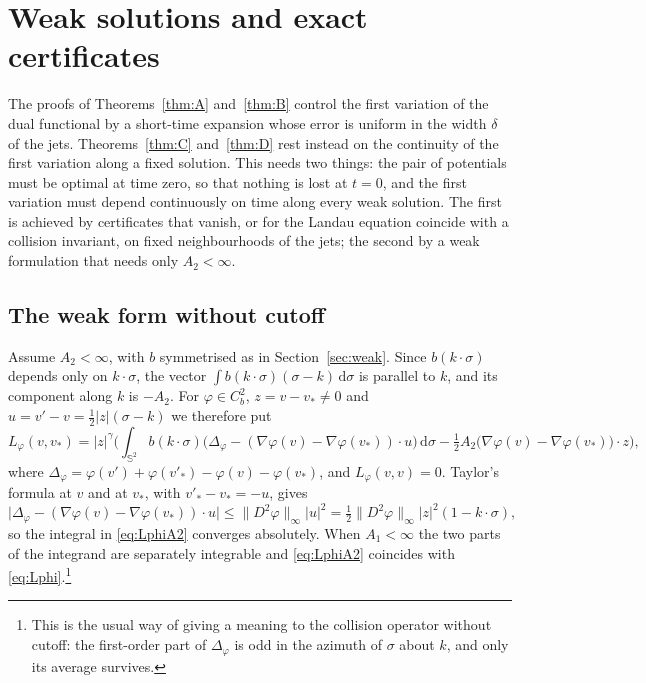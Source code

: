 \documentclass[11pt]{amsart}
\theoremstyle{definition}
\newcommand{\Sph}{\mathbb{S}}
\newcommand{\dd}{\,\mathrm{d}}
\begin{document}
\section{Weak solutions and exact certificates}\label{sec:exact}

The proofs of Theorems~\ref{thm:A} and~\ref{thm:B} control the first variation of the dual functional by a short-time expansion whose error is uniform in the width $\delta$ of the jets. Theorems~\ref{thm:C} and~\ref{thm:D} rest instead on the continuity of the first variation along a fixed solution. This needs two things: the pair of potentials must be optimal at time zero, so that nothing is lost at $t=0$, and the first variation must depend continuously on time along every weak solution. The first is achieved by certificates that vanish, or for the Landau equation coincide with a collision invariant, on fixed neighbourhoods of the jets; the second by a weak formulation that needs only $A_2<\infty$.

\subsection{The weak form without cutoff}
Assume $A_2<\infty$, with $b$ symmetrised as in Section~\ref{sec:weak}. Since $b(k\cdot\sigma)$ depends only on $k\cdot\sigma$, the vector $\int b(k\cdot\sigma)(\sigma-k)\dd\sigma$ is parallel to $k$, and its component along $k$ is $-A_2$. For $\varphi\in C^2_b$, $z=v-v_*\ne0$ and $u=v'-v=\frac12|z|(\sigma-k)$ we therefore put
\begin{equation}\label{eq:LphiA2}
L_\varphi(v,v_*)=|z|^\gamma\Big(\int_{\Sph^2}b(k\cdot\sigma)\big(\Delta_\varphi-(\nabla\varphi(v)-\nabla\varphi(v_*))\cdot u\big)\dd\sigma-\tfrac12A_2\big(\nabla\varphi(v)-\nabla\varphi(v_*)\big)\cdot z\Big),
\end{equation}
where $\Delta_\varphi=\varphi(v')+\varphi(v'_*)-\varphi(v)-\varphi(v_*)$, and $L_\varphi(v,v)=0$. Taylor's formula at $v$ and at $v_*$, with $v'_*-v_*=-u$, gives
\begin{equation}\label{eq:taylor2}
\big|\Delta_\varphi-(\nabla\varphi(v)-\nabla\varphi(v_*))\cdot u\big|\le\|D^2\varphi\|_\infty|u|^2=\tfrac12\|D^2\varphi\|_\infty|z|^2(1-k\cdot\sigma),
\end{equation}
so the integral in \eqref{eq:LphiA2} converges absolutely. When $A_1<\infty$ the two parts of the integrand are separately integrable and \eqref{eq:LphiA2} coincides with \eqref{eq:Lphi}.\footnote{This is the usual way of giving a meaning to the collision operator without cutoff: the first-order part of $\Delta_\varphi$ is odd in the azimuth of $\sigma$ about $k$, and only its average survives.}
\end{document}
